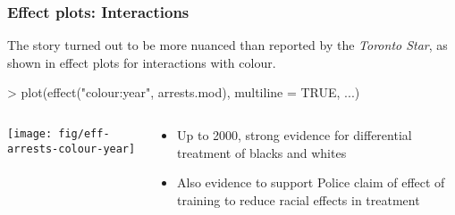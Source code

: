 %

\begin{frame}[fragile]
	\frametitle{Effect plots: Interactions}
	The story turned out to be more nuanced than reported by the \emph{Toronto Star},
	as shown in effect plots for interactions with colour.

\begin{Schunk}
\begin{Sinput}
> plot(effect("colour:year", arrests.mod), multiline = TRUE, ...)
\end{Sinput}
\end{Schunk}
\begin{columns}
\begin{column}{0.55\textwidth}
\texttt{[image: fig/eff-arrests-colour-year]}
\end{column}
\begin{column}{0.45\textwidth}
	\begin{small}
	\begin{itemize}
	 \item Up to 2000, strong evidence for differential treatment of blacks
	       and whites
	 \item Also evidence to support Police claim of effect of training to
	 reduce racial effects in treatment
	\end{itemize}
    \end{small}
\end{column}
\end{columns}
\end{frame}

